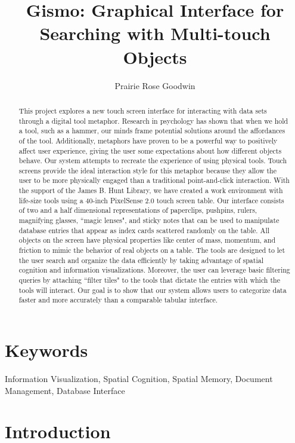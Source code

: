 \documentclass{article}
\begin{document}
\title{Gismo: Graphical Interface for Searching with Multi-touch Objects}
\author{Prairie Rose Goodwin}
\date{}
\maketitle
\begin{abstract}
This project explores a new touch screen interface for interacting with data sets through a digital tool metaphor.  Research in psychology has shown that when we hold a tool, such as a hammer, our minds frame potential solutions around the affordances of the tool.  Additionally, metaphors have proven to be a powerful way to positively affect user experience, giving the user some expectations about how different objects behave.  Our system attempts to recreate the experience of using physical tools. Touch screens provide the ideal interaction style for this metaphor because they allow the user to be more physically engaged than a traditional point-and-click interaction. With the support of the James B. Hunt Library, we have created a work environment with life-size tools using a 40-inch PixelSense 2.0 touch screen table.  Our interface consists of two and a half dimensional representations of paperclips, pushpins, rulers, magnifying glasses, ``magic lenses", and sticky notes that can be used to manipulate database entries that appear as index cards scattered randomly on the table.  All objects on the screen have physical properties like center of mass, momentum, and friction to mimic the behavior of real objects on a table.  The tools are designed to let the user search and organize the data efficiently by taking advantage of spatial cognition and information visualizations.  Moreover, the user can leverage basic filtering queries by attaching ``filter tiles" to the tools that dictate the entries with which the tools will interact.  Our goal is to show that our system allows users to categorize data faster and more accurately than a comparable tabular interface.
\end{abstract}
\section{Keywords}
Information Visualization, Spatial Cognition, Spatial Memory, Document Management, Database Interface

\section{Introduction}	
\end{document}
